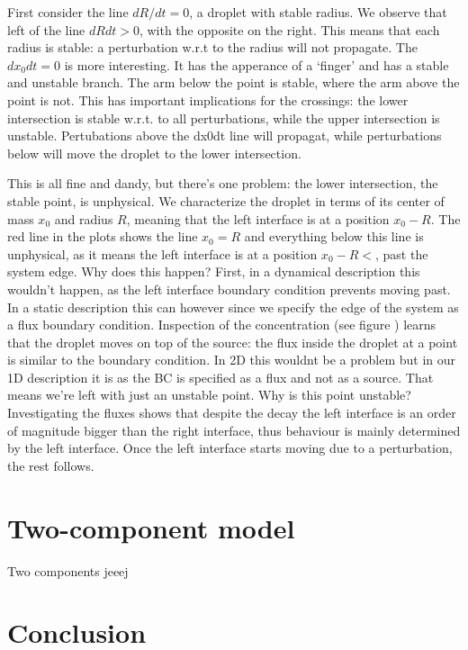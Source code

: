 \documentclass[12pt,a4paper,]{Dissertate}
\begin{document}
First consider the line \(dR/dt=0\), a droplet with stable radius. We
observe that left of the line \(dRdt>0\), with the opposite on the
right. This means that each radius is stable: a perturbation w.r.t to
the radius will not propagate. The \(dx_0dt=0\) is more interesting. It
has the apperance of a `finger' and has a stable and unstable branch.
The arm below the point is stable, where the arm above the point is not.
This has important implications for the crossings: the lower
intersection is stable w.r.t. to all perturbations, while the upper
intersection is unstable. Pertubations above the dx0dt line will
propagat, while perturbations below will move the droplet to the lower
intersection.

This is all fine and dandy, but there's one problem: the lower
intersection, the stable point, is unphysical. We characterize the
droplet in terms of its center of mass \(x_0\) and radius \(R\), meaning
that the left interface is at a position \(x_0-R\). The red line in the
plots shows the line \(x_0=R\) and everything below this line is
unphysical, as it means the left interface is at a position \(x_0-R<\),
past the system edge. Why does this happen? First, in a dynamical
description this wouldn't happen, as the left interface boundary
condition prevents moving past. In a static description this can however
since we specify the edge of the system as a flux boundary condition.
Inspection of the concentration (see figure ) learns that the droplet
moves on top of the source: the flux inside the droplet at a point is
similar to the boundary condition. In 2D this wouldnt be a problem but
in our 1D description it is as the BC is specified as a flux and not as
a source. That means we're left with just an unstable point. Why is this
point unstable? Investigating the fluxes shows that despite the decay
the left interface is an order of magnitude bigger than the right
interface, thus behaviour is mainly determined by the left interface.
Once the left interface starts moving due to a perturbation, the rest
follows.

\hypertarget{two-component-model}{%
\section{Two-component model}\label{two-component-model}}

Two components jeeej

\hypertarget{conclusion-2}{%
\section{Conclusion}\label{conclusion-2}}
\end{document}
